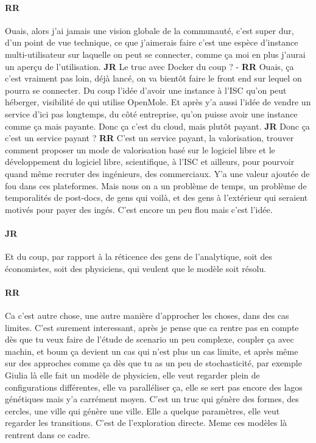 \documentclass[12pt]{article}
\begin{document}
\paragraph{RR}

Ouais, alors j'ai jamais une vision globale de la communauté, c'est super dur, d'un point de vue technique, ce que j'aimerais faire c'est une espèce d'instance multi-utilisateur sur laquelle on peut se connecter, comme ça moi en plus j'aurai un aperçu de l'utilisation. \textbf{JR} Le truc avec Docker du coup ? - \textbf{RR} Ouais, ça c'est vraiment pas loin, déjà lancé, on va bientôt faire le front end sur lequel on pourra se connecter. Du coup l'idée d'avoir une instance à l'ISC qu'on peut héberger, visibilité de qui utilise OpenMole. Et après y'a aussi l'idée de vendre un service d'ici pas longtemps, du côté entreprise, qu'on puisse avoir une instance comme ça mais payante. Donc ça c'est du cloud, mais plutôt payant. \textbf{JR} Donc ça c'est un service payant ? \textbf{RR} C'est un service payant, la valorisation, trouver comment proposer un mode de valorisation basé sur le logiciel libre et le développement du logiciel libre, scientifique, à l'ISC et ailleurs, pour pourvoir quand même recruter des ingénieurs, des commerciaux. Y'a une valeur ajoutée de fou dans ces plateformes. Mais nous on a un problème de temps, un problème de temporalités de post-docs, de gens qui voilà, et des gens à l'extérieur qui seraient motivés pour payer des ingés. C'est encore un peu flou mais c'est l'idée.



\paragraph{JR}

Et du coup, par rapport à la réticence des gens de l'analytique, soit des économistes, soit des physiciens, qui veulent que le modèle soit résolu.

\paragraph{RR}

Ca c'est autre chose, une autre manière d'approcher les choses, dans des cas limites. C'est surement interessant, après je pense que ca rentre pas en compte dès que tu veux faire de l'étude de scenario un peu complexe, coupler ça avec machin, et boum ça devient un cas qui n'est plus un cas limite, et après même sur des approches comme ça dès que tu as un peu de stochasticité, par exemple Giulia là elle fait un modèle de physicien, elle veut regarder plein de configurations différentes, elle va paralléliser ça, elle se sert pas encore des lagos génétiques mais y'a carrément moyen. C'est un truc qui génère des formes, des cercles, une ville qui génère une ville. Elle a quelque paramètres, elle veut regarder les transitions. C'est de l'exploration directe. Meme ces modèles là rentrent dans ce cadre. %
\end{document}
